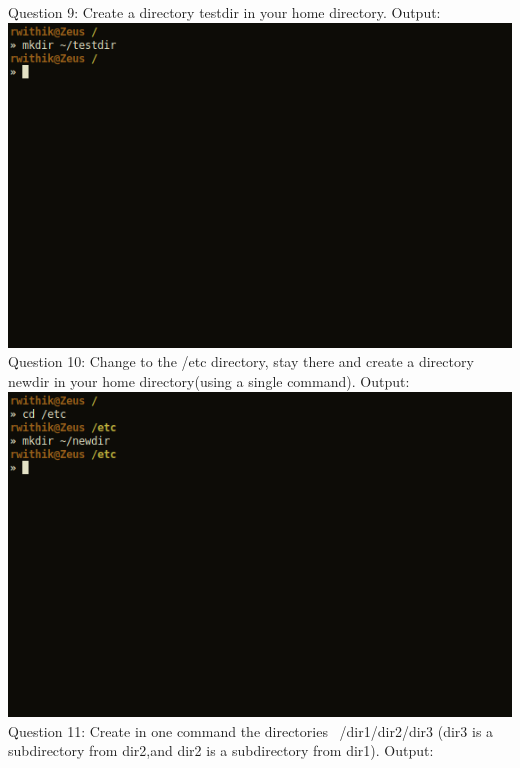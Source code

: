 \documentclass[10pt,a4paper,titlepage]{report}
\begin{document}
\newline
Question 9: Create a directory testdir in your home directory.\newline
Output:\newline
\includegraphics[scale=.5]{../Images/Cycle2/9.png}\newline
\newline
Question 10: Change to the /etc directory, stay there and create a directory newdir in your home
directory(using a single command).\newline
Output:\newline
\includegraphics[scale=.5]{../Images/Cycle2/10.png}\pagebreak
\newline
Question 11: Create in one command the directories ~/dir1/dir2/dir3 (dir3 is a subdirectory from dir2,and dir2 is a subdirectory from dir1).\newline
Output:\newline
\end{document}
